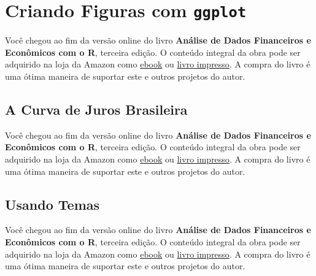 \documentclass[
  11pt,
]{book}
\newenvironment{pleasebuyit}
{\begin{noteblock}
		
	} {\end{noteblock}}
\begin{document}
\hypertarget{criando-figuras-com-ggplot}{%
\section{\texorpdfstring{Criando Figuras com \texttt{ggplot}}{Criando Figuras com ggplot}}\label{criando-figuras-com-ggplot}}

\begin{pleasebuyit}
Você chegou ao fim da versão online do livro \textbf{Análise de Dados
Financeiros e Econômicos com o R}, terceira edição. O conteúdo integral
da obra pode ser adquirido na loja da Amazon como
\href{https://www.amazon.com.br/dp/B08WNC27ZY}{ebook} ou
\href{https://www.amazon.com/dp/B08WP8CCDB}{livro impresso}. A compra do
livro é uma ótima maneira de suportar este e outros projetos do autor.
\end{pleasebuyit}

\hypertarget{a-curva-de-juros-brasileira}{%
\subsection{A Curva de Juros Brasileira}\label{a-curva-de-juros-brasileira}}

\begin{pleasebuyit}
Você chegou ao fim da versão online do livro \textbf{Análise de Dados
Financeiros e Econômicos com o R}, terceira edição. O conteúdo integral
da obra pode ser adquirido na loja da Amazon como
\href{https://www.amazon.com.br/dp/B08WNC27ZY}{ebook} ou
\href{https://www.amazon.com/dp/B08WP8CCDB}{livro impresso}. A compra do
livro é uma ótima maneira de suportar este e outros projetos do autor.
\end{pleasebuyit}

\hypertarget{usando-temas}{%
\subsection{Usando Temas}\label{usando-temas}}

\begin{pleasebuyit}
Você chegou ao fim da versão online do livro \textbf{Análise de Dados
Financeiros e Econômicos com o R}, terceira edição. O conteúdo integral
da obra pode ser adquirido na loja da Amazon como
\href{https://www.amazon.com.br/dp/B08WNC27ZY}{ebook} ou
\href{https://www.amazon.com/dp/B08WP8CCDB}{livro impresso}. A compra do
livro é uma ótima maneira de suportar este e outros projetos do autor.
\end{pleasebuyit}
\end{document}
